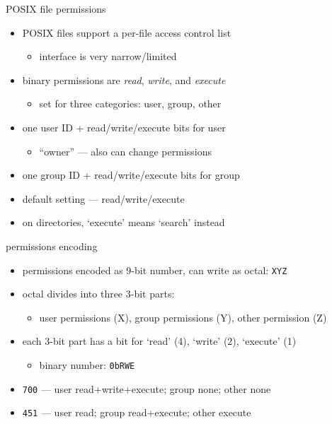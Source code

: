 \begin{frame}{POSIX file permissions}
    \begin{itemize}
    \item POSIX files support a per-file access control list
        \begin{itemize}
            \item interface is very narrow/limited
        \end{itemize}
    \item binary permissions are \textit{read}, \textit{write}, and \textit{execute}
        \begin{itemize}
            \item set for three categories: user, group, other
        \end{itemize}
    \vspace{.5cm}
    \item one user ID + read/write/execute bits for user
        \begin{itemize}
        \item ``owner'' --- also can change permissions
        \end{itemize}
    \item one group ID + read/write/execute bits for group
    \item default setting --- read/write/execute
    \vspace{.5cm}
    \item on directories, `execute' means `search' instead
    \end{itemize}
\end{frame}

\begin{frame}{permissions encoding}
\begin{itemize}
    \item permissions encoded as 9-bit number, can write as octal: \texttt{XYZ}
    \item octal divides into three 3-bit parts:
        \begin{itemize}
        \item user permissions (X), group permissions (Y), other permission (Z)
        \end{itemize}
    \item each 3-bit part has a bit for `read' (4), `write' (2), `execute' (1)
        \begin{itemize}
        \item binary number: \texttt{0bRWE}
        \end{itemize}
    \vspace{.5cm}
    \item<2-> \texttt{700} --- user read+write+execute; group none; other none
    \item<3-> \texttt{451} --- user read; group read+execute; other execute
\end{itemize}
\end{frame}

